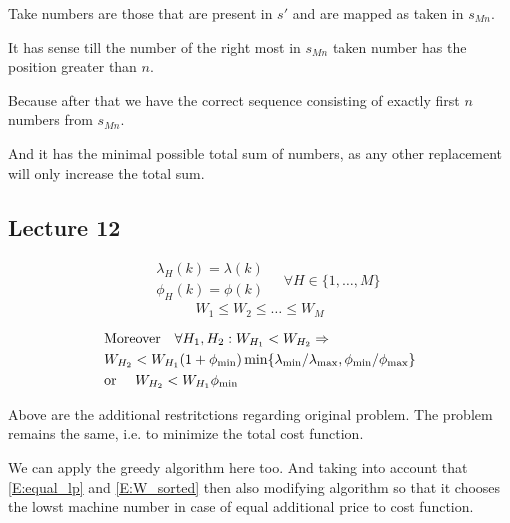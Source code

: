\documentclass{amsart}
\begin{document}
Take numbers are those that are present in $s'$ and are mapped as taken
in $s_{Mn}$.

It has sense till the number of the right most in $s_{Mn}$ taken number
has the position greater than $n$.

Because after that we have the correct sequence consisting of exactly
first $n$ numbers from $s_{Mn}$.

And it has the minimal possible total sum of numbers, as any other
replacement will only increase the total sum.

\subsection{Lecture 12}

\begin{multicols}{2}
  \hfill
  \begin{equation}\label{E:equal_lp}
    \begin{aligned}
      & \lambda_H(k) = \lambda(k) \\
      & \phi_H(k) = \phi(k)
    \end{aligned}
    \quad \forall H \in \{1,\dots,M\}
  \end{equation}
  \hfill
  \begin{equation}\label{E:W_sorted}
    W_1 \leqslant W_2 \leqslant \dots \leqslant W_M
  \end{equation}
  \hfill
\end{multicols}

\begin{equation}\label{E:pl_minmax}
  \begin{aligned}
    & \text{Moreover\quad }
    \forall H_1, H_2: W_{H_1} < W_{H_2} \Rightarrow \\
    & W_{H_2} < W_{H_1} (1 + \phi_{\min})
      \min\{
        \lambda_{\min} / \lambda_{\max},
        \phi_{\min} / \phi_{\max}
      \} \\
    & \text{or \quad}
    W_{H_2} < W_{H_1} \phi_{\min}
  \end{aligned}
\end{equation}

Above are the additional restritctions regarding original problem.
The problem remains the same, i.e. to minimize the total cost function.

We can apply the greedy algorithm here too. And taking into account
that \eqref{E:equal_lp} and \eqref{E:W_sorted} then also modifying
algorithm so that it chooses the lowst machine number in case of equal
additional price to cost function.
\end{document}
